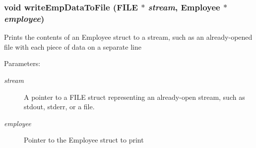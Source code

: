 \subsubsection{\setlength{\rightskip}{0pt plus 5cm}void write\-Emp\-Data\-To\-File (FILE $\ast$ {\em stream}, \bf{Employee} $\ast$ {\em employee})}\label{struct_8c_d234119b28ad4ab9888a754b8b469994}


Prints the contents of an Employee struct to a stream, such as an already-opened file with each piece of data on a separate line \begin{Desc}
\item[Parameters:]
\begin{description}
\item[{\em stream}]A pointer to a FILE struct representing an already-open stream, such as stdout, stderr, or a file. \item[{\em employee}]Pointer to the Employee struct to print \end{description}
\end{Desc}
